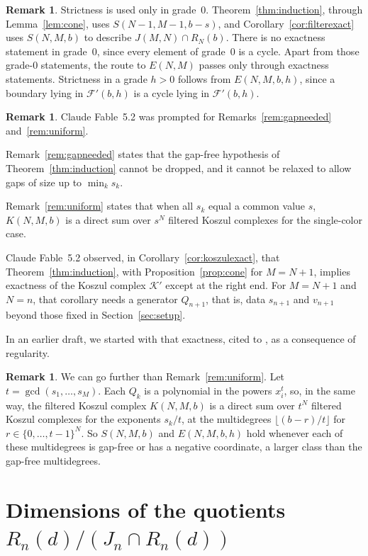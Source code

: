 \documentclass[12pt]{amsart}
\theoremstyle{definition}
\newtheorem{remark1}[theorem]{Remark}
\theoremstyle{remark}
\newcommand{\K}{\mathcal K}
\newcommand{\FF}{\mathcal F}
\begin{document}
\begin{remark1}\label{rem:Szero}
Strictness is used only in grade~$0$.  Theorem~\ref{thm:induction},
through Lemma~\ref{lem:cone}, uses $S(N-1,M-1,b-s)$, and
Corollary~\ref{cor:filterexact} uses $S(N,M,b)$ to describe
$J(M,N)\cap R_N(b)$.  There is no exactness statement in grade~$0$, since
every element of grade~$0$ is a cycle.  Apart from those grade-$0$
statements, the route to $E(N,M)$ passes only through exactness
statements.  Strictness in a grade $h > 0$ follows from
$E(N,M,b,h)$, since a boundary lying in $\FF'(b,h)$ is a cycle lying in
$\FF'(b,h)$.
\end{remark1}

\begin{remark1}
Claude Fable~5.2 was prompted for Remarks~\ref{rem:gapneeded} and~\ref{rem:uniform}.

Remark~\ref{rem:gapneeded} states that the gap-free
hypothesis of Theorem~\ref{thm:induction} cannot be dropped,
and it cannot be relaxed to allow gaps of size up to $\min_k s_k$.

Remark~\ref{rem:uniform} states that when all $s_k$ equal a common value $s$, 
$K(N, M, b)$ is a direct sum over $s^N$ filtered Koszul complexes for the single-color case.

Claude Fable~5.2 observed, in Corollary~\ref{cor:koszulexact},
that Theorem~\ref{thm:induction}, with Proposition~\ref{prop:cone} for
$M=N+1$, implies exactness of the Koszul complex $\K'$ except at the right end.
For $M=N+1$ and $N=n$, that corollary needs a generator $Q_{n+1}$, that is,
data $s_{n+1}$ and $v_{n+1}$ beyond those fixed in Section~\ref{sec:setup}.

In an earlier draft, we started with that exactness, cited to \cite[Cor.~17.5]{Eisenbud1995},
as a consequence of regularity.
\end{remark1}
\begin{remark1}
We can go further than Remark~\ref{rem:uniform}.  Let $t = \gcd(s_1, \ldots, s_M)$.
Each $Q_k$ is a polynomial in the powers $x_i^{t}$, so, in the same way,
the filtered Koszul complex $K(N, M, b)$ is a direct sum over $t^N$ filtered
Koszul complexes for the exponents $s_k / t$, at the multidegrees
$\lfloor (b-r)/t\rfloor$ for $r\in\{0,\ldots,t-1\}^N$.  So $S(N,M,b)$ and
$E(N,M,b,h)$ hold whenever each of these multidegrees is gap-free or has a
negative coordinate, a larger class than the gap-free multidegrees.
\end{remark1}


\section{Dimensions of the quotients \texorpdfstring{$R_n(d) / (J_n\cap R_n(d))$}{R\_n(d)/(J\_n cap R\_n(d))}}\label{sec:dimcount}
\end{document}
